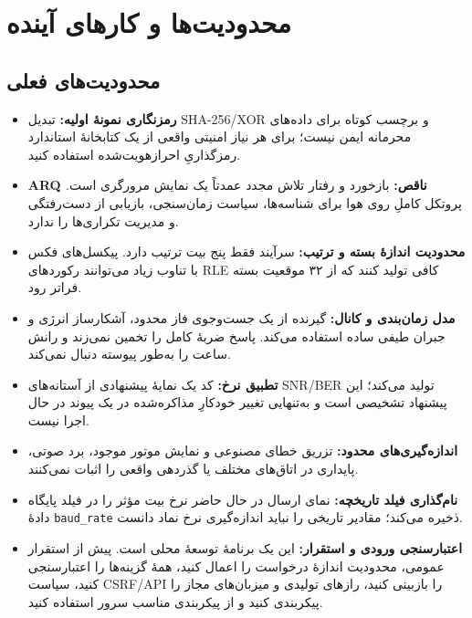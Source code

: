 \documentclass[12pt,a4paper]{article}
\providecommand{\lr}[1]{\foreignlanguage{english}{\begingroup\hyphenchar\font=-1 #1\endgroup}}
\newcommand{\code}[1]{\lr{\texttt{#1}}}
\begin{document}
\section{محدودیت‌ها و کارهای آینده}
\label{sec:limitations}

\subsection{محدودیت‌های فعلی}
\begin{itemize}
    \item \textbf{رمزنگاری نمونۀ اولیه:} تبدیل \lr{SHA-256/XOR} و برچسب کوتاه برای داده‌های محرمانه ایمن نیست؛ برای هر نیاز امنیتی واقعی از یک کتابخانۀ استاندارد رمزگذاریِ احراز‌هویت‌شده استفاده کنید.
    \item \textbf{\lr{ARQ} ناقص:} بازخورد و رفتار تلاش مجدد عمدتاً یک نمایش مرورگری است. پروتکل کاملِ روی هوا برای شناسه‌ها، سیاست زمان‌سنجی، بازیابی از دست‌رفتگی و مدیریت تکراری‌ها را ندارد.
    \item \textbf{محدودیت اندازۀ بسته و ترتیب:} سرآیند فقط پنج بیت ترتیب دارد. پیکسل‌های فکس با تناوب زیاد می‌توانند رکوردهای \lr{RLE} کافی تولید کنند که از ۳۲ موقعیت بسته فراتر رود.
    \item \textbf{مدل زمان‌بندی و کانال:} گیرنده از یک جست‌وجوی فاز محدود، آشکارساز انرژی و جبران طیفی ساده استفاده می‌کند. پاسخ ضربۀ کامل را تخمین نمی‌زند و رانش ساعت را به‌طور پیوسته دنبال نمی‌کند.
    \item \textbf{تطبیق نرخ:} کد یک نمایۀ پیشنهادی از آستانه‌های \lr{SNR/BER} تولید می‌کند؛ این پیشنهاد تشخیصی است و به‌تنهایی تغییر خودکارِ مذاکره‌شده در یک پیوند در حال اجرا نیست.
    \item \textbf{اندازه‌گیری‌های محدود:} تزریق خطای مصنوعی و نمایش موتور موجود، برد صوتی، پایداری در اتاق‌های مختلف یا گذردهی واقعی را اثبات نمی‌کنند.
    \item \textbf{نام‌گذاری فیلد تاریخچه:} نمای ارسال در حال حاضر نرخ بیت مؤثر را در فیلد پایگاه دادۀ \code{baud\_rate} ذخیره می‌کند؛ مقادیر تاریخی را نباید اندازه‌گیری نرخ نماد دانست.
    \item \textbf{اعتبارسنجی ورودی و استقرار:} این یک برنامۀ توسعۀ محلی است. پیش از استقرار عمومی، محدودیت اندازۀ درخواست را اعمال کنید، همۀ گزینه‌ها را اعتبارسنجی کنید، سیاست \lr{CSRF/API} را بازبینی کنید، رازهای تولیدی و میزبان‌های مجاز را پیکربندی کنید و از پیکربندی مناسب سرور استفاده کنید.
\end{itemize}
\end{document}

